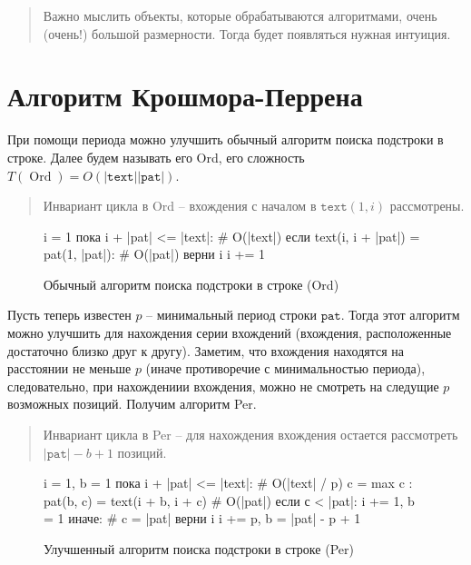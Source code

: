 \documentclass[letterpaper, 12pt]{article}
\newcommand{\textm}{\texttt{text}}
\newcommand{\patm}{\texttt{pat}}
\newenvironment{figurem}[1][]
  {\begin{figure}[t]
  \caption{#1}
  \centering
  }
  {
  \end{figure}
  }
\begin{document}
\begin{quote}
  Важно мыслить объекты, которые обрабатываются алгоритмами, очень (очень!)
  большой размерности. Тогда будет появляться нужная интуиция.
\end{quote}

\section{Алгоритм Крошмора-Перрена}

При помощи периода можно улучшить обычный алгоритм поиска подстроки в строке.
Далее будем называть его Ord, его сложность
$T(\operatorname{Ord}) = O(|\textm||\patm|)$.

\begin{quote}
  Инвариант цикла в Ord -- вхождения с началом в $\textm(1, i)$ рассмотрены.
\end{quote}

\begin{figurem}[Обычный алгоритм поиска подстроки в строке (Ord)]
\begin{verbm}
  i = 1
  пока i + |pat| <= |text|:  # O(|text|)
    если text(i, i + |pat|) = pat(1, |pat|):  # O(|pat|)
      верни i
    i += 1
\end{verbm}
\end{figurem}

Пусть теперь известен $p$ -- минимальный период строки $\patm$. Тогда этот
алгоритм можно улучшить для нахождения серии вхождений
(вхождения, расположенные достаточно близко друг к другу). Заметим, что
вхождения находятся на расстоянии не меньше $p$ (иначе противоречие с 
минимальностью периода), следовательно, при
нахождениии вхождения, можно не смотреть на следущие $p$ возможных позиций.
Получим алгоритм Per.
\begin{quote}
  Инвариант цикла в Per -- для нахождения вхождения 
  остается рассмотреть $|\patm| - b + 1$ позиций.
\end{quote}

\begin{figurem}[Улучшенный алгоритм поиска подстроки в строке (Per)]
\begin{verbm}
  i = 1, b = 1
  пока i + |pat| <= |text|:  # O(|text| / p)
    c = max { c : pat(b, c) = text(i + b, i + c) }  # O(|pat|)
    если с < |pat|:
      i += 1, b = 1
    иначе:  # c = |pat|
      верни i
      i += p, b = |pat| - p + 1
\end{verbm}
\end{figurem}
\end{document}
